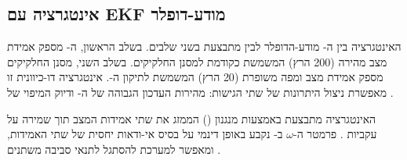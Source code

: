 \subsection{אינטגרציה עם EKF מודע-דופלר}
\label{sec:ch04_ekf_integration}

האינטגרציה בין ה- מודע-הדופלר לבין  מתבצעת בשני שלבים. בשלב הראשון, ה- מספק אמידת מצב מהירה (200 הרץ) המשמשת כקודמת למסנן החלקיקים. בשלב השני, מסנן החלקיקים מספק אמידת מצב ומפה משופרת (20 הרץ) המשמשת לתיקון ה-. אינטגרציה דו-כיוונית זו מאפשרת ניצול היתרונות של שתי הגישות: מהירות העדכון הגבוהה של ה- ודיוק המיפוי של .

האינטגרציה מתבצעת באמצעות מנגנון  () הממזג את שתי אמידות המצב תוך שמירה על עקביות \cite{Julier1997CovarianceIntersection}. פרמטר ה-$\omega$ ב- נקבע באופן דינמי על בסיס אי-ודאות יחסית של שתי האמידות, ומאפשר למערכת להסתגל לתנאי סביבה משתנים \cite{Dissanayake2001SLAM, Thrun2005ProbRobotics}.
